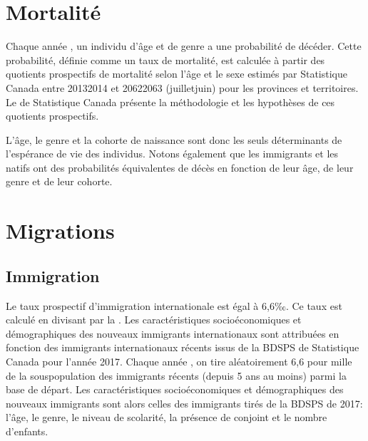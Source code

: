 \documentclass[letterpaper,10pt,french]{sphinxmanual}
\begin{document}
\section{Mortalité}
\label{\detokenize{methodologie:mortalite}}
Chaque année , un individu d’âge  et de genre  a une probabilité  de décéder. Cette probabilité, définie comme un taux de mortalité, est calculée à partir des quotients prospectifs de mortalité selon l’âge et le sexe estimés par Statistique Canada entre 2013\sphinxhyphen{}2014 et 2062\sphinxhyphen{}2063 (juillet\sphinxhyphen{}juin) pour les provinces et territoires. Le  de Statistique Canada présente la méthodologie et les hypothèses de ces quotients prospectifs.

L’âge, le genre et la cohorte de naissance sont donc les seuls déterminants de l’espérance de vie des individus. Notons également que les immigrants et les natifs ont des probabilités équivalentes de décès en fonction de leur âge, de leur genre et de leur cohorte.


\section{Migrations}
\label{\detokenize{methodologie:migrations}}

\subsection{Immigration}
\label{\detokenize{methodologie:immigration}}
Le taux prospectif d’immigration internationale est égal à 6,6‰. Ce taux est calculé en divisant  par la . Les caractéristiques socio\sphinxhyphen{}économiques et démographiques des nouveaux immigrants internationaux sont attribuées en fonction des immigrants internationaux récents issus de la BDSPS de Statistique Canada pour l’année 2017. Chaque année , on tire aléatoirement 6,6 pour mille de la sous\sphinxhyphen{}population des immigrants récents (depuis 5 ans au moins) parmi la base de départ. Les caractéristiques socio\sphinxhyphen{}économiques et démographiques des nouveaux immigrants sont alors celles des immigrants tirés de la BDSPS de 2017: l’âge, le genre, le niveau de scolarité, la présence de conjoint et le nombre d’enfants.
\end{document}

